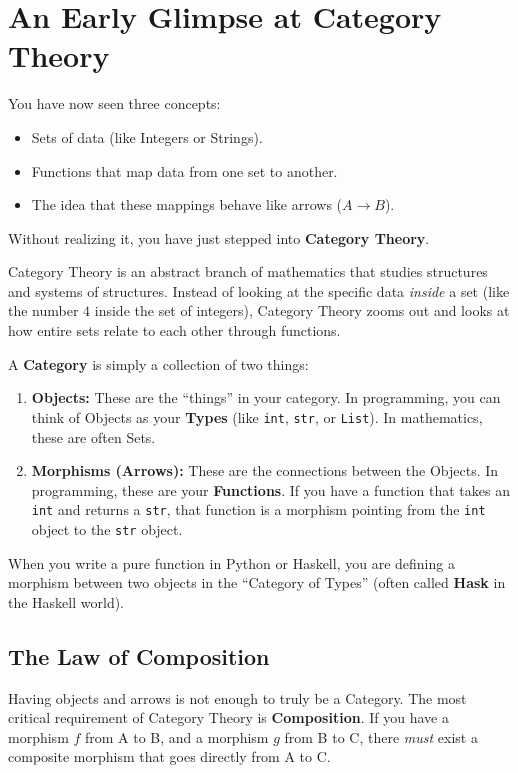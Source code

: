 \section{An Early Glimpse at Category Theory}

You have now seen three concepts:
\begin{itemize}
    \item Sets of data (like Integers or Strings).
    \item Functions that map data from one set to another.
    \item The idea that these mappings behave like arrows ($A \rightarrow B$).
\end{itemize}

Without realizing it, you have just stepped into \textbf{Category Theory}.

Category Theory is an abstract branch of mathematics that studies structures and systems of structures. Instead of looking at the specific data \textit{inside} a set (like the number $4$ inside the set of integers), Category Theory zooms out and looks at how entire sets relate to each other through functions.

A \textbf{Category} is simply a collection of two things:
\begin{enumerate}
    \item \textbf{Objects:} These are the ``things'' in your category. In programming, you can think of Objects as your \textbf{Types} (like \texttt{int}, \texttt{str}, or \texttt{List}). In mathematics, these are often Sets.
    \item \textbf{Morphisms (Arrows):} These are the connections between the Objects. In programming, these are your \textbf{Functions}. If you have a function that takes an \texttt{int} and returns a \texttt{str}, that function is a morphism pointing from the \texttt{int} object to the \texttt{str} object.
\end{enumerate}

When you write a pure function in Python or Haskell, you are defining a morphism between two objects in the ``Category of Types'' (often called \textbf{Hask} in the Haskell world).

\subsection{The Law of Composition}
Having objects and arrows is not enough to truly be a Category. The most critical requirement of Category Theory is \textbf{Composition}. If you have a morphism $f$ from A to B, and a morphism $g$ from B to C, there \textit{must} exist a composite morphism that goes directly from A to C.

